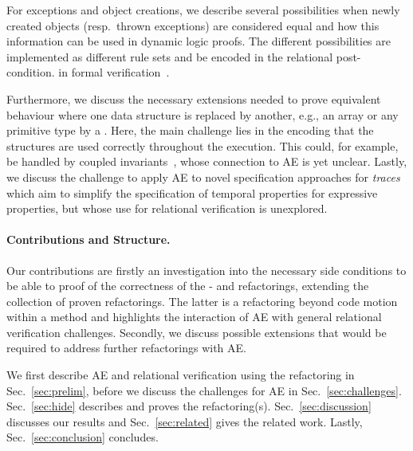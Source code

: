 For exceptions and object creations, we describe several possibilities when newly created objects (resp.\ thrown exceptions) are considered equal
and how this information can be used in dynamic logic proofs. The different possibilities are implemented as different rule sets and  be encoded in the relational post-condition.
 in formal verification~\cite{DBLP:journals/corr/abs-1211-6186,DBLP:series/lncs/HahnleH19}.


Furthermore, we discuss the necessary extensions needed to prove equivalent behaviour where one data structure is replaced by another, e.g., an array or any primitive type by a .
Here, the main challenge lies in the encoding that the structures are used correctly throughout the execution.
This could, for example, be handled by coupled invariants~\cite{DBLP:conf/birthday/BeckertU18}, whose connection to AE is yet unclear. 
Lastly, we discuss the challenge to apply AE to novel specification approaches for \emph{traces} which aim to simplify the specification of temporal properties for expressive properties, but whose use for relational verification is unexplored.

\paragraph{Contributions and Structure.}
Our contributions are firstly an investigation into the necessary side conditions to be able to proof of the correctness of the - and  refactorings, extending the collection of proven refactorings.
The latter is a refactoring beyond code motion within a method and highlights the interaction of AE with general relational verification challenges.
Secondly, we discuss possible extensions that would be required to address further refactorings with AE.

We first describe AE and relational verification using the  refactoring in Sec.~\ref{sec:prelim}, before we discuss the challenges for AE in Sec.~\ref{sec:challenges}. Sec.~\ref{sec:hide} describes and proves the  refactoring(s). Sec.~\ref{sec:discussion} discusses our results and Sec.~\ref{sec:related} gives the related work. Lastly, Sec.~\ref{sec:conclusion} concludes.



